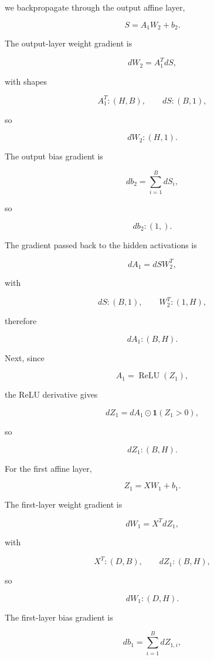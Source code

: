 \documentclass[11pt]{article}
\begin{document}
we backpropagate through the output affine layer,

      \[
        S = A_1 W_2 + b_2.
      \]

The output-layer weight gradient is

      \[
        dW_2
        =
        A_1^T dS,
      \]

with shapes

      \[
        A_1^T:(H,B),
        \qquad
        dS:(B,1),
      \]

so

      \[
        dW_2:(H,1).
      \]

The output bias gradient is

      \[
        db_2
        =
        \sum_{i=1}^{B} dS_i,
      \]

so

      \[
        db_2:(1,).
      \]

The gradient passed back to the hidden activations is

      \[
        dA_1
        =
        dS W_2^T,
      \]

with

      \[
        dS:(B,1),
        \qquad
        W_2^T:(1,H),
      \]

therefore

      \[
        dA_1:(B,H).
      \]

Next, since

      \[
        A_1=\operatorname{ReLU}(Z_1),
      \]

the ReLU derivative gives

      \[
        dZ_1
        =
        dA_1 \odot \mathbf{1}(Z_1>0),
      \]

so

      \[
        dZ_1:(B,H).
      \]

For the first affine layer,

      \[
        Z_1=XW_1+b_1.
      \]

The first-layer weight gradient is

      \[
        dW_1
        =
        X^T dZ_1,
      \]

with

      \[
        X^T:(D,B),
        \qquad
        dZ_1:(B,H),
      \]

so

    \[
      dW_1:(D,H).
    \]

The first-layer bias gradient is

    \[
      db_1
      =
      \sum_{i=1}^{B} dZ_{1,i},
    \]
\end{document}

